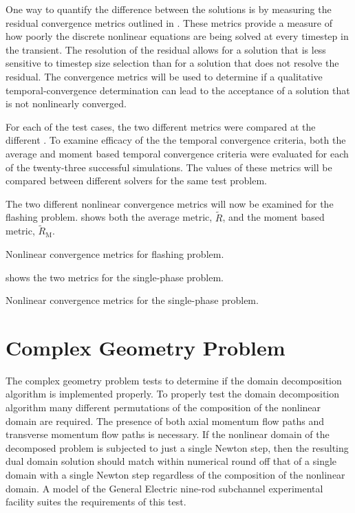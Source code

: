 One way to quantify the difference between the solutions is by measuring the residual convergence metrics outlined in .
These metrics provide a measure of how poorly the discrete nonlinear equations are being solved at every timestep in the transient.
The resolution of the residual allows for a solution that is less sensitive to timestep size selection than for a solution that does not resolve the residual.
The convergence metrics will be used to determine if a qualitative temporal-convergence determination can lead to the acceptance of a solution that is not nonlinearly converged.

For each of the test cases, the two different metrics were compared at the different \dtmax{}.
To examine efficacy of the the temporal convergence criteria, both the average and moment based temporal convergence criteria were evaluated for each of the twenty-three successful simulations.
The values of these metrics will be compared between different solvers for the same test problem. 

The two different nonlinear convergence metrics will now be examined for the flashing problem.
 shows both the average metric, $\tilde{R}$, and the moment based metric, $\tilde{R}_{\text{M}}$.

\begin{table}[h!t]
\centering
\singlespace

\caption{Nonlinear convergence metrics for flashing problem.}
\label{tab:flashing_criteria}
\end{table}

 shows the two metrics for the single-phase problem.

\begin{table}[h!t]
\centering
\singlespace

\caption{Nonlinear convergence metrics for the single-phase problem.}
\label{tab:single_criteria}
\end{table}


\section{Complex Geometry Problem}
\label{sect:complexProblem}
The complex geometry problem tests to determine if the domain decomposition algorithm is implemented properly.
To properly test the domain decomposition algorithm many different permutations of the composition of the nonlinear domain are required.
The presence of both axial momentum flow paths and transverse momentum flow paths is necessary.
If the nonlinear domain of the decomposed problem is subjected to just a single Newton step, then the resulting dual domain solution should match within numerical round off that of a single domain with a single Newton step regardless of the composition of the nonlinear domain.
A model of the General Electric nine-rod subchannel experimental facility \cite{Lahey1970} suites the requirements of this test.


